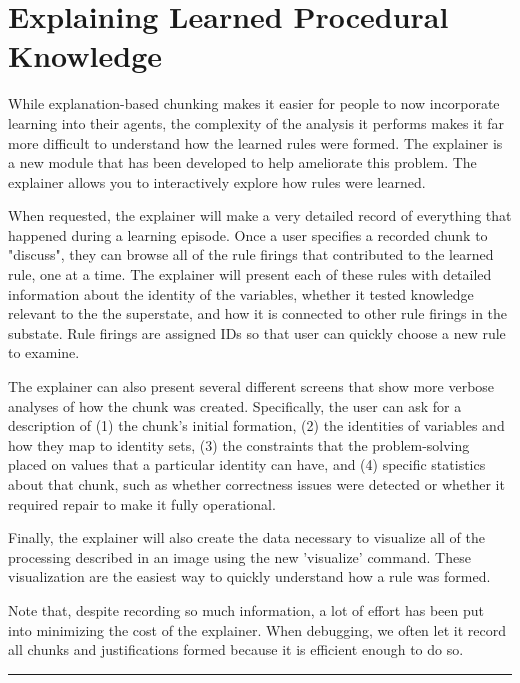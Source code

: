 \section{Explaining Learned Procedural Knowledge}

While explanation-based chunking makes it easier for people to now incorporate learning into their agents, the complexity of the analysis it performs makes it far more difficult to understand how the learned rules were formed. The explainer is a new module that has been developed to help ameliorate this problem. The explainer allows you to interactively explore how rules were learned.

When requested, the explainer will make a very detailed record of everything that happened during a learning episode. Once a user specifies a recorded chunk to "discuss", they can browse all of the rule firings that contributed to the learned rule, one at a time. The explainer will present each of these rules with detailed information about the identity of the variables, whether it tested knowledge relevant to the the superstate, and how it is connected to other rule firings in the substate. Rule firings are assigned IDs so that user can quickly choose a new rule to examine.

The explainer can also present several different screens that show more verbose analyses of how the chunk was created. Specifically, the user can ask for a description of (1) the chunk's initial formation, (2) the identities of variables and how they map to identity sets, (3) the constraints that the problem-solving placed on values that a particular identity can have, and (4) specific statistics about that chunk, such as whether correctness issues were detected or whether it required repair to make it fully operational.

Finally, the explainer will also create the data necessary to visualize all of the processing described in an image using the new 'visualize' command. These visualization are the easiest way to quickly understand how a rule was formed.

Note that, despite recording so much information, a lot of effort has been put into minimizing the cost of the explainer. When debugging, we often let it record all chunks and justifications formed because it is efficient enough to do so.

\rule{\textwidth}{1pt}

